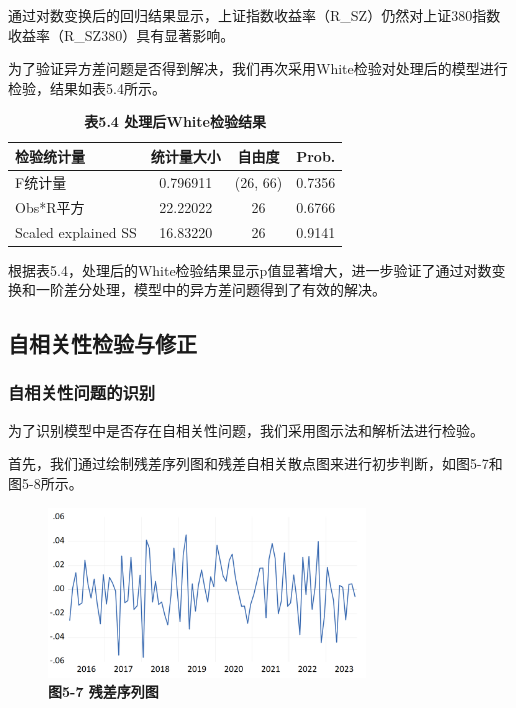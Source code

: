 \documentclass[12pt, a4paper]{article}
\numberwithin{equation}{section}
\begin{document}
通过对数变换后的回归结果显示，上证指数收益率（R\_SZ）仍然对上证380指数收益率（R\_SZ380）具有显著影响。

为了验证异方差问题是否得到解决，我们再次采用White检验对处理后的模型进行检验，结果如表5.4所示。

\begin{table}[h!]
    \centering
    \captionsetup{labelformat=empty}
    \caption{\textbf{\fontsize{9pt}{11pt}\selectfont 表5.4 处理后White检验结果}}
    \begin{tabular}{lccc}
        \toprule
        检验统计量               & 统计量大小    & 自由度      & Prob.  \\
        \midrule
        F统计量                & 0.796911 & (26, 66) & 0.7356 \\
        Obs*R平方             & 22.22022 & 26       & 0.6766 \\
        Scaled explained SS & 16.83220 & 26       & 0.9141 \\
        \bottomrule
    \end{tabular}
\end{table}

根据表5.4，处理后的White检验结果显示p值显著增大，进一步验证了通过对数变换和一阶差分处理，模型中的异方差问题得到了有效的解决。


\subsection{自相关性检验与修正}
\subsubsection{自相关性问题的识别}
为了识别模型中是否存在自相关性问题，我们采用图示法和解析法进行检验。

首先，我们通过绘制残差序列图和残差自相关散点图来进行初步判断，如图5-7和图5-8所示。

\begin{figure}[h!]
    \centering
    \includegraphics[width=0.75\textwidth]{./img/e.png}
    \captionsetup{labelformat=empty}
    \caption{\textbf{\fontsize{9pt}{11pt}\selectfont 图5-7 残差序列图}}
\end{figure}
\end{document}

